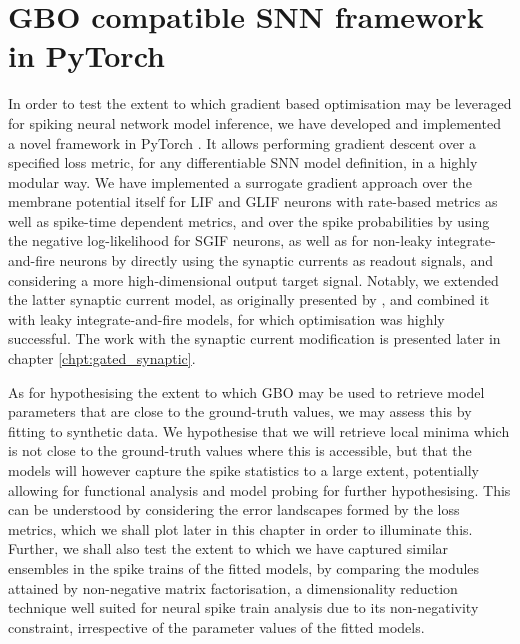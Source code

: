 \documentclass[mphil,deptreport,ianc]{infthesis} %
\begin{document}
\section{GBO compatible SNN framework in PyTorch}


In order to test the extent to which gradient based optimisation may be leveraged for spiking neural network model inference, we have developed and implemented a novel framework in PyTorch \cite{Paszke2017, Paszke2019}.
It allows performing gradient descent over a specified loss metric, for any differentiable SNN model definition, in a highly modular way.
We have implemented a surrogate gradient approach over the membrane potential itself for LIF and GLIF neurons with rate-based metrics as well as spike-time dependent metrics, and over the spike probabilities by using the negative log-likelihood for SGIF neurons, as well as for non-leaky integrate-and-fire neurons by directly using the synaptic currents as readout signals, and considering a more high-dimensional output target signal.
Notably, we extended the latter synaptic current model, as originally presented by \cite{Huh2017}, and combined it with leaky integrate-and-fire models, for which optimisation was highly successful. The work with the synaptic current modification is presented later in chapter \ref{chpt:gated_synaptic}.

As for hypothesising the extent to which GBO may be used to retrieve model parameters that are close to the ground-truth values, we may assess this by fitting to synthetic data.
We hypothesise that we will retrieve local minima which is not close to the ground-truth values where this is accessible, but that the models will however capture the spike statistics to a large extent, potentially allowing for functional analysis and model probing for further hypothesising. 
This can be understood by considering the error landscapes formed by the loss metrics, which we shall plot later in this chapter in order to illuminate this.
Further, we shall also test the extent to which we have captured similar ensembles in the spike trains of the fitted models, by comparing the modules attained by non-negative matrix factorisation, a dimensionality reduction technique well suited for neural spike train analysis due to its non-negativity constraint, irrespective of the parameter values of the fitted models.
\end{document}
